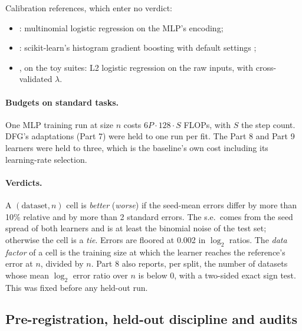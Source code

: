 Calibration references, which enter no verdict:
\begin{itemize}
\item {}: multinomial logistic regression on the MLP's encoding;
\item {}: scikit-learn's histogram gradient boosting with default settings \cite{pedregosa2011sklearn};
\item {}, on the toy suites: L2 logistic regression on the raw inputs, with cross-validated $\lambda$.
\end{itemize}

\paragraph{Budgets on standard tasks.} One MLP training run at size $n$ costs $6P\cdot128\cdot S$ FLOPs, with $S$ the step count. DFG's adaptations (Part 7) were held to one run per fit. The Part 8 and Part 9 learners were held to three, which is the baseline's own cost including its learning-rate selection.

\paragraph{Verdicts.} A $(\text{dataset},n)$ cell is \emph{better} (\emph{worse}) if the seed-mean errors differ by more than 10\% relative and by more than 2 standard errors. The s.e.\ comes from the seed spread of both learners and is at least the binomial noise of the test set; otherwise the cell is a \emph{tie}. Errors are floored at 0.002 in $\log_2$ ratios. The \emph{data factor} of a cell is the training size at which the learner reaches the reference's error at $n$, divided by $n$. Part 8 also reports, per split, the number of datasets whose mean $\log_2$ error ratio over $n$ is below 0, with a two-sided exact sign test. This was fixed before any held-out run.

\subsection{Pre-registration, held-out discipline and audits}\label{sec:discipline}

